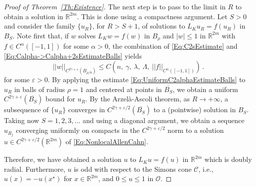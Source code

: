 \documentclass[12pt,reqno]{amsart}
\theoremstyle{definition}
\theoremstyle{remark}
\newcommand{\con}[1]{\mathbb{#1}}
\newcommand{\R}{\con{R}} %
\newcommand{\ccal}{\mathscr{C}}
\newcommand{\ocal}{\mathcal{O}}
\newcommand{\norm}[1]{\left | \left |{#1} \right | \right |}
\newcommand{\s}{\gamma}
\newcommand{\bpar}[1]{\left ( {#1}\right )}
\numberwithin{equation}{section}
\begin{document}
\begin{proof}[Proof of Theorem~\ref{Th:Existence}]
	The next step is to pass to the limit in $R$ to obtain a solution in $\R^{2m}$. This is done using a compactness argument. Let $S>0$ and consider the family $\{u_R\}$, for $R> S + 1$, of solutions to $L_K u_R = f(u_R)$ in $B_{S}$. Note first that, if $w$ solves $L_K w = f(w)$ in $B_\rho$ and  $|w|\leq 1$ in $\R^{2m}$ with $f\in C^{\alpha}([-1,1])$ for some $\alpha > 0$, the combination of \eqref{Eq:C2sEstimate} and \eqref{Eq:Calpha->Calpha+2sEstimateBalls} yields
	\begin{equation}
	\label{Eq:UniformC2alphaEstimateBalls}
	\norm{w}_{C^{2\s + \varepsilon}(B_{\rho/8})} \leq C \bpar{n,\ \s ,\ \lambda,\ \Lambda ,\ \norm{f}_{C^{\alpha}([-1,1])} }\,.
	\end{equation}
	for some $\varepsilon > 0$.  By applying the estimate \eqref{Eq:UniformC2alphaEstimateBalls} to $u_R$ in balls of radius $\rho = 1$ and centered at points in $\overline{B_{S}}$, we obtain a uniform $C^{2\s + \varepsilon}(\overline{B_S})$ bound for $u_R$. By the Arzelà-Ascoli theorem, as $R\to +\infty$, a subsequence of $\{u_R\}$ converges in $C^{2\s + \varepsilon/2}(\overline{B_S})$ to a (pointwise) solution in $B_S$. Taking now $S = 1,2,3,\ldots$ and using a diagonal argument, we obtain a sequence $u_{R_j}$ converging uniformly on compacts in the $C^{2\s + \varepsilon/2}$ norm to a solution $u \in C^{2\s + \varepsilon/2}(\R^{2m})$ of \eqref{Eq:NonlocalAllenCahn}.
	
	Therefore, we have obtained a solution $u$ to $L_K u = f(u)$ in $\R^{2m}$ which is doubly radial. Furthermore, $u$ is odd with respect to the Simons cone $\ccal$, i.e., $u(x) = -u(x^\star)$ for $x\in \R^{2m}$, and $0 \leq u\leq 1$ in $\ocal$.
	

\end{proof}
\end{document}
